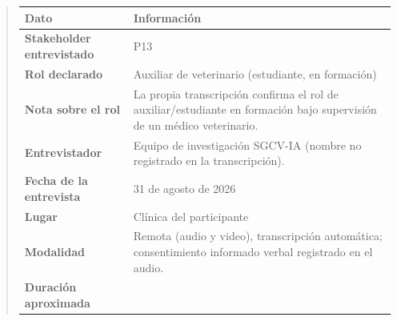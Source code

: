 \documentclass[
]{article}
\newcounter{none} %
\begin{document}
\begin{quote}
{\def\LTcaptype{none} %
\begin{longtable}[]{|
  >{\raggedright\arraybackslash}p{}|
  >{\raggedright\arraybackslash}p{}|}
\hline
\begin{minipage}[b]{\linewidth}\centering
\textbf{Dato}
\end{minipage} & \begin{minipage}[b]{\linewidth}\centering
\textbf{Información}
\end{minipage} \\
\hline
\endhead
\hline
\endlastfoot
\textbf{Stakeholder entrevistado} & \begin{minipage}[t]{\linewidth}\raggedright
P13
\end{minipage} \\
\hline
\textbf{Rol declarado} & \begin{minipage}[t]{\linewidth}\raggedright
Auxiliar de veterinario (estudiante, en formación)
\end{minipage} \\
\hline
\textbf{Nota sobre el rol} & \begin{minipage}[t]{\linewidth}\raggedright
La propia transcripción confirma el rol de auxiliar/estudiante en formación bajo supervisión de un médico veterinario.
\end{minipage} \\
\hline
\textbf{Entrevistador} & \begin{minipage}[t]{\linewidth}\raggedright
Equipo de investigación SGCV-IA (nombre no registrado en la transcripción).
\end{minipage} \\
\hline
\textbf{Fecha de la entrevista} & \begin{minipage}[t]{\linewidth}\raggedright
31 de agosto de 2026
\end{minipage} \\
\hline
\textbf{Lugar} & \begin{minipage}[t]{\linewidth}\raggedright
Clínica del participante
\end{minipage} \\
\hline
\textbf{Modalidad} & \begin{minipage}[t]{\linewidth}\raggedright
Remota (audio y video), transcripción automática; consentimiento informado verbal registrado en el audio.
\end{minipage} \\
\hline
\textbf{Duración aproximada} & \begin{minipage}[t]{\linewidth}\raggedright

\end{minipage}
\end{longtable}}
\end{quote}
\end{document}

